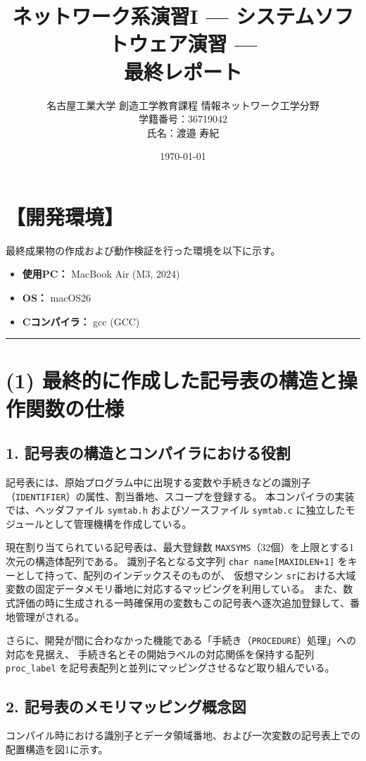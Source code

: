\documentclass[11pt,a4paper,dvipdfmx]{bxjsarticle}
\title{ネットワーク系演習I --- システムソフトウェア演習 ---\\ 最終レポート}
\author{名古屋工業大学 創造工学教育課程 情報ネットワーク工学分野 \\ 学籍番号：36719042 \\ 氏名：渡邉 寿紀}
\date{\today}
\begin{document}
\maketitle

\section*{【開発環境】}
最終成果物の作成および動作検証を行った環境を以下に示す。
\begin{itemize}
    \item \textbf{使用PC：} MacBook Air (M3, 2024)
    \item \textbf{OS：} macOS26
    \item \textbf{Cコンパイラ：} gcc (GCC) 
\end{itemize}

\noindent\rule{\linewidth}{0.4pt}


\section*{(1) 最終的に作成した記号表の構造と操作関数の仕様}

\subsection*{1. 記号表の構造とコンパイラにおける役割}
記号表には、原始プログラム中に出現する変数や手続きなどの識別子（\texttt{IDENTIFIER}）の属性、割当番地、スコープを登録する。
本コンパイラの実装では、ヘッダファイル \texttt{symtab.h} およびソースファイル \texttt{symtab.c} に独立したモジュールとして管理機構を作成している。

現在割り当てられている記号表は、最大登録数 \texttt{MAXSYMS}（32個）を上限とする1次元の構造体配列である。
識別子名となる文字列 \texttt{char name[MAXIDLEN+1]} をキーとして持って、配列のインデックスそのものが、
仮想マシン \texttt{sr}における大域変数の固定データメモリ番地に対応するマッピングを利用している。
また、数式評価の時に生成される一時確保用の変数もこの記号表へ逐次追加登録して、番地管理がされる。

さらに、開発が間に合わなかった機能である「手続き（\texttt{PROCEDURE}）処理」への対応を見据え、
手続き名とその開始ラベルの対応関係を保持する配列 \texttt{proc\_label} を記号表配列と並列にマッピングさせるなど取り組んでいる。

\subsection*{2. 記号表のメモリマッピング概念図}
コンパイル時における識別子とデータ領域番地、および一次変数の記号表上での配置構造を図1に示す。
\end{document}
